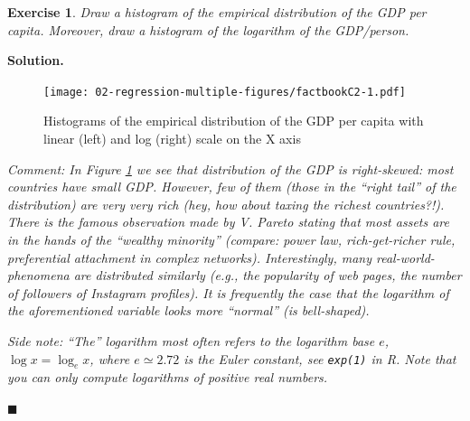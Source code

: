\documentclass[10pt,b5paper,krantz1]{krantz}
\newenvironment{Shaded}{\begin{snugshade}}{\end{snugshade}}
\newcommand{\DataTypeTok}[1]{\textcolor[rgb]{0.27,0.27,0.27}{#1}}
\newcommand{\DecValTok}[1]{\textcolor[rgb]{0.06,0.06,0.06}{#1}}
\newcommand{\KeywordTok}[1]{\textcolor[rgb]{0.27,0.27,0.27}{\textbf{#1}}}
\newcommand{\NormalTok}[1]{#1}
\newcommand{\OperatorTok}[1]{\textcolor[rgb]{0.43,0.43,0.43}{\textbf{#1}}}
\newcommand{\OtherTok}[1]{\textcolor[rgb]{0.37,0.37,0.37}{#1}}
\newcommand{\StringTok}[1]{\textcolor[rgb]{0.5,0.5,0.5}{#1}}
\newtheorem{exercise}{Exercise}[chapter]
\newenvironment{solution}{%
\bigskip\noindent\textbf{Solution. }%
\it\ignorespaces%
\ignorespaces%
}{\ignorespaces%
\hfill$\blacksquare$%
}
\begin{document}
\begin{exercise}

Draw a histogram of the empirical distribution
of the GDP per capita. Moreover, draw a histogram of the logarithm
of the GDP/person.

\end{exercise}

\begin{solution}

\begin{Shaded}
\end{Shaded}

\begin{figure}
\hypertarget{fig:factbookC2}{%
\centering
\texttt{[image: 02-regression-multiple-figures/factbookC2-1.pdf]}
\caption{Histograms of the empirical distribution of the GDP per capita with linear (left) and log (right) scale on the X axis}\label{fig:factbookC2}
}
\end{figure}

\emph{Comment: In Figure \ref{fig:factbookC2} we see that
distribution of the GDP is right-skewed: most countries
have small GDP. However, few of them
(those in the ``right tail'' of the distribution)
are very very rich (hey, how about taxing the richest countries?!).
There is the famous observation made by V. Pareto
stating that most assets are in the hands of the ``wealthy minority''
(compare: power law, rich-get-richer rule, preferential attachment in complex networks).
Interestingly, many real-world-phenomena are distributed similarly
(e.g., the popularity of web pages, the number of followers of Instagram
profiles). It is frequently the case that the logarithm of the aforementioned
variable looks more ``normal'' (is bell-shaped).}

\emph{Side note: ``The'' logarithm most often refers to the logarithm base
\(e\), \(\log x = \log_e x\),
where \(e\simeq 2.72\) is the Euler constant, see \texttt{exp(1)} in R.
Note that you can only compute logarithms of positive real numbers.}


\end{solution}
\end{document}
